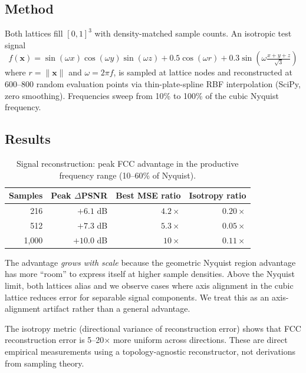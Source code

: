 \documentclass[11pt]{article}
\begin{document}
\subsection{Method}

Both lattices fill $[0,1]^3$ with density-matched sample counts.
An isotropic test signal
\begin{equation}
  f(\mathbf{x}) = \sin(\omega x)\cos(\omega y)\sin(\omega z)
    + 0.5\cos(\omega r) + 0.3\sin\!\left(\omega\tfrac{x+y+z}{\sqrt{3}}\right)
\end{equation}
where $r = \|\mathbf{x}\|$ and $\omega = 2\pi f$, is sampled at
lattice nodes and reconstructed at 600--800 random evaluation points
via thin-plate-spline RBF interpolation (SciPy, zero smoothing).
Frequencies sweep from 10\% to 100\% of the cubic Nyquist frequency.

\subsection{Results}

\begin{table}[H]
\centering
\caption{Signal reconstruction: peak FCC advantage in the
productive frequency range (10--60\% of Nyquist).}
\label{tab:signal}
\begin{tabular}{rrrr}
\toprule
Samples & Peak $\Delta$PSNR & Best MSE ratio & Isotropy ratio \\
\midrule
216   & $+6.1$ dB  & $4.2\times$ & $0.20\times$ \\
512   & $+7.3$ dB  & $5.3\times$ & $0.05\times$ \\
1{,}000 & $+10.0$ dB & $10\times$  & $0.11\times$ \\
\bottomrule
\end{tabular}
\end{table}

The advantage \emph{grows with scale} because the geometric
Nyquist region advantage has more ``room'' to express itself at
higher sample densities. Above the Nyquist limit, both lattices
alias and we observe cases where axis alignment in the cubic lattice
reduces error for separable signal components. We treat this as an
axis-alignment artifact rather than a general advantage.

The isotropy metric (directional variance of reconstruction error)
shows that FCC reconstruction error is 5--20$\times$ more uniform
across directions. These are direct empirical measurements using a
topology-agnostic reconstructor, not derivations from sampling
theory.
\end{document}
